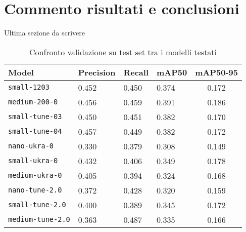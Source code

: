 \section{Commento risultati e conclusioni}

Ultima sezione da scrivere


\begin{table}[htbp]
    \centering
    \begin{tabularx}{\textwidth}{lYYYc}
        \toprule
        Model & Precision & Recall & mAP50 & mAP50-95 \\
        \midrule
        \texttt{small-1203} & 0.452 & 0.450 & 0.374 & 0.172 \\
        \texttt{medium-200-0} & 0.456 & 0.459 & 0.391 & 0.186 \\
        \texttt{small-tune-03} & 0.450 & 0.451 & 0.382 & 0.170\\
        \texttt{small-tune-04} & 0.457 & 0.449 & 0.382 & 0.172 \\
        \midrule
        \texttt{nano-ukra-0} & 0.330 & 0.379 & 0.308 & 0.149 \\
        \texttt{small-ukra-0} & 0.432 & 0.406 & 0.349 & 0.178 \\
        \texttt{medium-ukra-0} &  0.405 & 0.394 & 0.324 & 0.168 \\
        \midrule
        \texttt{nano-tune-2.0} & 0.372 & 0.428 & 0.320 & 0.159 \\
        \texttt{small-tune-2.0} & 0.400 & 0.389 & 0.345 & 0.172 \\
        \texttt{medium-tune-2.0} & 0.363 & 0.487 & 0.335 & 0.166 \\
        \bottomrule
    \end{tabularx}
    \caption{Confronto validazione su test set tra i modelli testati}
    \label{table:general-results}
\end{table}